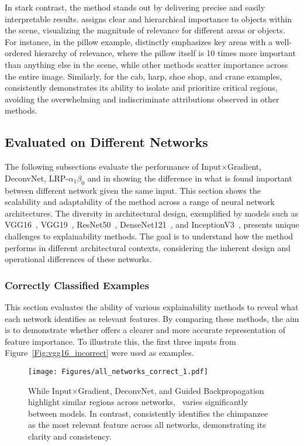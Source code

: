 In stark contrast, the \CTC\/ method stands out by delivering precise and easily interpretable results. \CTC\/ assigns clear and hierarchical importance to objects within the scene, visualizing the magnitude of relevance for different areas or objects. For instance, in the pillow example, \CTC\/ distinctly emphasizes key areas with a well-ordered hierarchy of relevance, where the pillow itself is 10 times more important than anything else in the scene, while other methods scatter importance across the entire image. Similarly, for the cab, harp, shoe shop, and crane examples, \CTC\/ consistently demonstrates its ability to isolate and prioritize critical regions, avoiding the overwhelming and indiscriminate attributions observed in other methods.

\subsection{\CTC\/ Evaluated on Different Networks}

The following subsections evaluate the performance of Input$\times$Gradient, DeconvNet, LRP-$\alpha_1\beta_0$ and \CTC\/ in showing the difference in what is found important between different network given the same input. This section shows the scalability and adaptability of the \CTC\/ method across a range of neural network architectures. The diversity in architectural design, exemplified by models such as VGG16~\cite{SimonyanZ14a}, VGG19~\cite{SimonyanZ14a}, ResNet50~\cite{he2015deep}, DenseNet121~\cite{huang2018densely}, and InceptionV3~\cite{szegedy2015rethinking}, presents unique challenges to explainability methods. The goal is to understand how the \CTC\/ method performs in different architectural contexts, considering the inherent design and operational differences of these networks. 

\subsubsection{Correctly Classified Examples}

This section evaluates the ability of various explainability methods to reveal what each network identifies as relevant features. By comparing these methods, the aim is to demonstrate whether \CTC\/ offers a clearer and more accurate representation of feature importance. To illustrate this, the first three inputs from Figure~\ref{Fig:vgg16_incorrect} were used as examples.

\begin{figure}[ht!]
	\begin{center}
		\texttt{[image: Figures/all\_networks\_correct\_1.pdf]}
	\end{center}
	\caption{While Input$\times$Gradient, DeconvNet, and Guided Backpropagation highlight similar regions across networks, \LRP\ varies significantly between models. In contrast, \CTC\/ consistently identifies the chimpanzee as the most relevant feature across all networks, demonstrating its clarity and consistency.}
	\label{Fig:compare_models_same_1}
\end{figure} 


